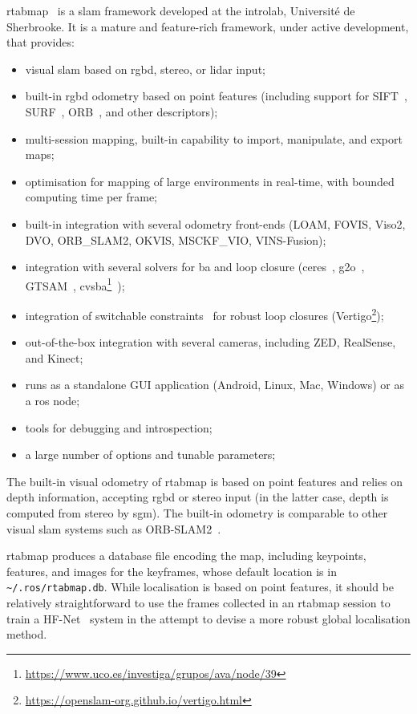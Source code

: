\documentclass[11pt, letterpaper, twoside]{article}
\begin{document}
\gls{rtabmap}~\cite{labbe2019rtab} is a \gls{slam} framework developed at the
\gls{introlab}, Université de Sherbrooke. It is a mature and feature-rich
framework, under active development, that provides:
\begin{itemize}
    \item visual \gls{slam} based on \gls{rgbd}, stereo, or lidar input;
    \item built-in \gls{rgbd} odometry based on point features (including
        support for SIFT~\cite{lowe1999object}, SURF~\cite{bay2006surf},
        ORB~\cite{rublee2011orb}, and other descriptors);
    \item multi-session mapping, built-in capability to import, manipulate, and
        export maps;
    \item optimisation for mapping of large environments in real-time, with
        bounded computing time per frame;
    \item built-in integration with several odometry front-ends (LOAM, FOVIS,
        Viso2, DVO, ORB\_SLAM2, OKVIS, MSCKF\_VIO, VINS-Fusion);
    \item integration with several solvers for \gls{ba} and loop closure
        (ceres~\cite{ceres-solver}, g2o~\cite{grisetti2011g2o},
        GTSAM~\cite{dellaert2006square},
        cvsba\footnote{\url{https://www.uco.es/investiga/grupos/ava/node/39}}~\cite{lourakis2009sba});
    \item integration of switchable constraints~\cite{sunderhauf2012switchable}
        for robust loop closures
        (Vertigo\footnote{\url{https://openslam-org.github.io/vertigo.html}});
    \item out-of-the-box integration with several cameras, including ZED,
        RealSense, and Kinect;
    \item runs as a standalone GUI application (Android, Linux, Mac, Windows)
        or as a \gls{ros} node;
    \item tools for debugging and introspection;
    \item a large number of options and tunable parameters;
\end{itemize}

The built-in visual odometry of \gls{rtabmap} is based on point features and
relies on depth information, accepting \gls{rgbd} or stereo input (in the
latter case, depth is computed from stereo by \gls{sgm}). The built-in odometry
is comparable to other visual \gls{slam} systems such as
ORB-SLAM2~\cite{ragot2019benchmark}.

\gls{rtabmap} produces a database file encoding the map, including keypoints,
features, and images for the keyframes, whose default location is in
\texttt{\textasciitilde/.ros/rtabmap.db}. While localisation is based on point features, it
should be relatively straightforward to use the frames collected in an
\gls{rtabmap} session to train a HF-Net~\cite{sarlin2019coarse} system in the
attempt to devise a more robust global localisation method.
\end{document}
